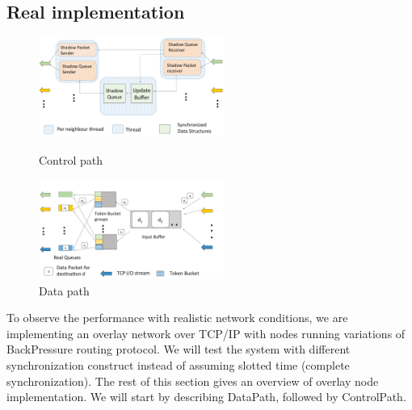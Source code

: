 \subsection{Real implementation}
%

\begin{figure}
\centering
\begin{minipage}[b]{0.45\linewidth}
	\includegraphics[width=2.4in]{./figures/controlpath2.pdf}
	\caption{Control path}
	\label{fig:control}
	\centering
\end{minipage}
\begin{minipage}[b]{0.45\linewidth}
	\includegraphics[width=2.4in]{./figures/datapath4.pdf}
	\caption{Data path}
	\label{fig:data} 
	\centering
\end{minipage}
\end{figure}


To observe the performance with realistic network conditions, we are implementing an overlay network over TCP/IP with nodes running variations of BackPressure routing protocol. We will test the system with different synchronization construct instead of assuming slotted time (complete synchronization). The rest of this section gives an overview of overlay node implementation. We will start by describing DataPath, followed by ControlPath.

